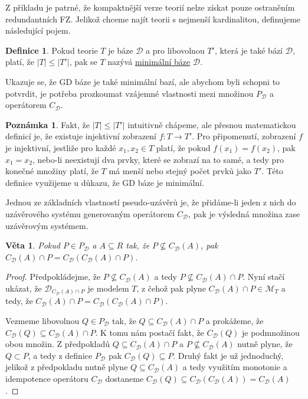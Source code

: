 \documentclass{article}
\newtheorem{theorem}{Věta}
\theoremstyle {definition}
\newtheorem{definition}{Definice}
\newtheorem*{remark}{Poznámka}
\begin{document}
Z příkladu je patrné, že kompaktnější verze teorií nelze získat pouze
ostraněním redundantních FZ. Jelikož chceme najít teorii s nejmenší
kardinalitou, definujeme následující pojem.

\begin{definition}
  Pokud teorie $T$ je báze $\mathcal{D}$ a pro libovolnou $T'$, která je také
  bází $\mathcal{D}$, platí, že $|T| \leq |T'|$, pak se $T$ nazývá
  \underline{minimální báze} $\mathcal{D}$.
\end{definition}

Ukazuje se, že GD báze je také minimální bazí, ale abychom byli
schopni to potvrdit, je potřeba prozkoumat vzájemné vlastnosti mezi
množinou $P_{\mathcal{D}}$ a operátorem $C_{\mathcal{D}}$.

\begin {remark}
  Fakt, že $|T| \leq |T'|$ intuitivně chápeme, ale přesnou
  matematickou definicí je, že existuje injektivní zobrazení $f:T
  \rightarrow T'$. Pro připomenutí, zobrazení $f$ je injektivní,
  jestliže pro každé $x_1,x_2\in T$ platí, že pokud $f(x_1)=f(x_2)$,
  pak $x_1=x_2$, nebo-li neexistují dva prvky, které se zobrazí na to
  samé, a tedy pro konečné množiny platí, že $T$ má menší nebo stejný
  počet prvků jako $T'$. Této definice využijeme u důkazu, že GD báze
  je minimální.
\end {remark}

Jednou ze základních vlastností pseudo-uzávěrů je, že přidáme-li jeden
z nich do uzávěrového systému generovaným operátorem
$C_{\mathcal{D}}$, pak je výsledná množina zase uzávěrovým systémem.

\begin{theorem}
  Pokud $P \in P_{\mathcal{D}}$ a $A \subseteq R$ tak, že $P
  \not\subseteq C_{\mathcal{D}}(A)$, pak $C_{\mathcal{D}}(A) \cap P =
  C_{\mathcal{D}}(C_{\mathcal{D}}(A) \cap P)$.
\end{theorem}

\begin{proof}
  Předpokládejme, že $P \not\subseteq C_{\mathcal{D}}(A)$ a tedy $P
  \not\subseteq C_{\mathcal{D}}(A) \cap P$. Nyní stačí ukázat, že
  $\mathcal{D}_{C_{\mathcal{D}}(A) \cap P}$ je modelem $T$, z čehož
  pak plyne $C_{\mathcal{D}}(A) \cap P \in \mathcal{M}_T$ a tedy, že
  $C_{\mathcal{D}}(A) \cap P = C_{\mathcal{D}}(C_{\mathcal{D}}(A) \cap
  P)$.

  Vezmeme libovolnou $Q \in P_{\mathcal{D}}$ tak, že $Q \subseteq
  C_{\mathcal{D}}(A) \cap P$ a prokážeme, že $C_{\mathcal{D}}(Q)
  \subseteq C_{\mathcal{D}}(A) \cap P$. K tomu nám postačí fakt, že
  $C_{\mathcal{D}}(Q)$ je podmnožinou obou množin. Z předpokladů $Q
  \subseteq C_{\mathcal{D}}(A) \cap P$ a $P \not\subseteq
  C_{\mathcal{D}}(A)$ nutně plyne, že $Q \subset P$, a tedy z definice
  $P_{\mathcal{D}}$ pak $C_{\mathcal{D}}(Q) \subseteq P$. Druhý fakt
  je už jednoduchý, jelikož z předpokladu nutně plyne 
  $Q \subseteq C_{\mathcal{D}}(A)$ a tedy využitím monotonie a
  idempotence operátoru $C_{\mathcal{D}}$ dostaneme
  $C_{\mathcal{D}}(Q) \subseteq C_{\mathcal{D}}(C_{\mathcal{D}}(A)) =
  C_{\mathcal{D}}(A)$.
\end{proof}
\end{document}

